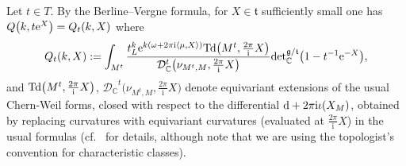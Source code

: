 \documentclass[pdftex]{sigma}
\numberwithin{equation}{section}
\newcommand{\pair}[2]{\langle #1, #2 \rangle}
\newcommand{\tn}[1]{\textnormal{#1}}
\renewcommand{\i}{{\mathrm{i}}}
\def\g{\ensuremath{\mathfrak{g}}}
\def\t{\ensuremath{\mathfrak{t}}}
\def\bC{\ensuremath{\mathbb{C}}}
\def\Td{\ensuremath{\textnormal{Td}}}
\def\calDC{\ensuremath{\mathcal{D}_{\bC}}}
\def\de{\ensuremath{\tn{det}_\bC}}
\begin{document}
Let $t \in T$. By the Berline--Vergne formula, for $X \in \t$ sufficiently small one has $Q\big(k,t{\rm e}^X\big)=Q_t(k,X)$ where
\begin{gather}\label{eqn:BerVer}
Q_t(k,X):=\int_{M^t} \frac{t_L^k {\rm e}^{k(\omega+2\pi \i\pair{\mu}{X})}\Td\big(M^t,\tfrac{2\pi}{\i}X\big)}{\calDC^t\big(\nu_{M^t,M},\tfrac{2\pi}{\i}X\big)}\de^{\g/\t}\big(1-t^{-1}{\rm e}^{-X}\big),
\end{gather}
and $\Td\big(M^t,\tfrac{2\pi}{\i}X\big)$, $\calDC^t\big(\nu_{M^t,M},\tfrac{2\pi}{\i}X\big)$ denote equivariant extensions of the usual Chern-Weil forms, closed with respect to the differential ${\rm d}+2\pi \i \iota(X_M)$, obtained by replacing curvatures with equivariant curvatures (evaluated at $\tfrac{2\pi}{\i}X$) in the usual formulas (cf.~\cite{BerlineGetzlerVergne} for details, although note that we are using the topologist's convention for characteristic classes).
\end{document}
